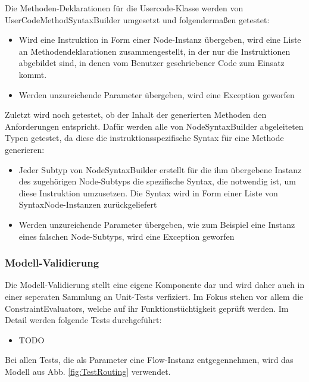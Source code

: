 Die Methoden-Deklarationen für die Usercode-Klasse werden von UserCodeMethodSyntaxBuilder umgesetzt und folgendermaßen getestet:

\begin{itemize}
\item Wird eine Instruktion in Form einer Node-Instanz übergeben, wird eine Liste an Methodendeklarationen zusammengestellt, in der nur die Instruktionen abgebildet sind, in denen vom Benutzer geschriebener Code zum Einsatz kommt.
\item Werden unzureichende Parameter übergeben, wird eine Exception geworfen
\end{itemize}

Zuletzt wird noch getestet, ob der Inhalt der generierten Methoden den Anforderungen entspricht. Dafür werden alle von NodeSyntaxBuilder abgeleiteten Typen getestet, da diese die instruktionsspezifische Syntax  für eine Methode generieren:

\begin{itemize}
\item Jeder Subtyp von NodeSyntaxBuilder erstellt für die ihm übergebene Instanz des zugehörigen Node-Subtyps die spezifische Syntax, die notwendig ist, um diese Instruktion umzusetzen. Die Syntax wird in Form einer Liste von SyntaxNode-Instanzen zurückgeliefert 
\item Werden unzureichende Parameter übergeben, wie zum Beispiel eine Instanz eines falschen Node-Subtyps, wird eine Exception geworfen
\end{itemize}

\subsubsection{Modell-Validierung}  
Die Modell-Validierung stellt eine eigene Komponente dar und wird daher auch in einer seperaten Sammlung an Unit-Tests verfiziert. Im Fokus stehen vor allem die ConstraintEvaluators, welche auf ihr Funktionstüchtigkeit geprüft werden. Im Detail werden folgende Tests durchgeführt:

\begin{itemize}
\item TODO
\end{itemize} 

Bei allen Tests, die als Parameter eine Flow-Instanz entgegennehmen, wird das Modell aus Abb. \ref{fig:TestRouting} verwendet. 

